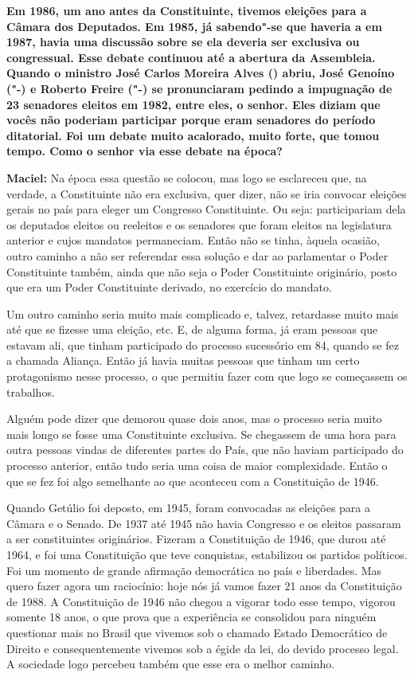 \textbf{Em 1986, um ano antes da Constituinte, tivemos eleições para a
Câmara dos Deputados. Em 1985, já sabendo"-se que haveria a  em 1987,
havia uma discussão sobre se ela deveria ser exclusiva ou congressual.
Esse debate continuou até a abertura da Assembleia. Quando o ministro
José Carlos Moreira Alves () abriu, José Genoíno ("-) e Roberto
Freire ("-) se pronunciaram pedindo a impugnação de 23 senadores
eleitos em 1982, entre eles, o senhor. Eles diziam que vocês não
poderiam participar porque eram senadores do período ditatorial. Foi um
debate muito acalorado, muito forte, que tomou tempo. Como o senhor via
esse debate na época?}

\textbf{Maciel:} Na época essa questão se colocou, mas logo se
esclareceu que, na verdade, a Constituinte não era exclusiva, quer
dizer, não se iria convocar eleições gerais no país para eleger um
Congresso Constituinte. Ou seja: participariam dela os deputados eleitos
ou reeleitos e os senadores que foram eleitos na legislatura anterior e
cujos mandatos permaneciam. Então não se tinha, àquela ocasião, outro
caminho a não ser referendar essa solução e dar ao parlamentar o Poder
Constituinte também, ainda que não seja o Poder Constituinte originário,
posto que era um Poder Constituinte derivado, no exercício do mandato.

Um outro caminho seria muito mais complicado e, talvez, retardasse muito
mais até que se fizesse uma eleição, etc. E, de alguma forma, já eram
pessoas que estavam ali, que tinham participado do processo sucessório
em 84, quando se fez a chamada Aliança. Então já havia muitas pessoas
que tinham um certo protagonismo nesse processo, o que permitiu fazer
com que logo se começassem os trabalhos.

Alguém pode dizer que demorou quase dois anos, mas o processo seria
muito mais longo se fosse uma Constituinte exclusiva. Se chegassem de
uma hora para outra pessoas vindas de diferentes partes do País, que não
haviam participado do processo anterior, então tudo seria uma coisa de
maior complexidade. Então o que se fez foi algo semelhante ao que
aconteceu com a Constituição de 1946.

Quando Getúlio foi deposto, em 1945, foram convocadas as eleições para a
Câmara e o Senado. De 1937 até 1945 não havia Congresso e os eleitos
passaram a ser constituintes originários. Fizeram a Constituição de
1946, que durou até 1964, e foi uma Constituição que teve conquistas,
estabilizou os partidos políticos. Foi um momento de grande afirmação
democrática no país e liberdades. Mas quero fazer agora um raciocínio:
hoje nós já vamos fazer 21 anos da Constituição de 1988. A Constituição
de 1946 não chegou a vigorar todo esse tempo, vigorou somente 18 anos, o
que prova que a experiência se consolidou para ninguém questionar mais
no Brasil que vivemos sob o chamado Estado Democrático de Direito e
consequentemente vivemos sob a égide da lei, do devido processo legal. A
sociedade logo percebeu também que esse era o melhor caminho.

